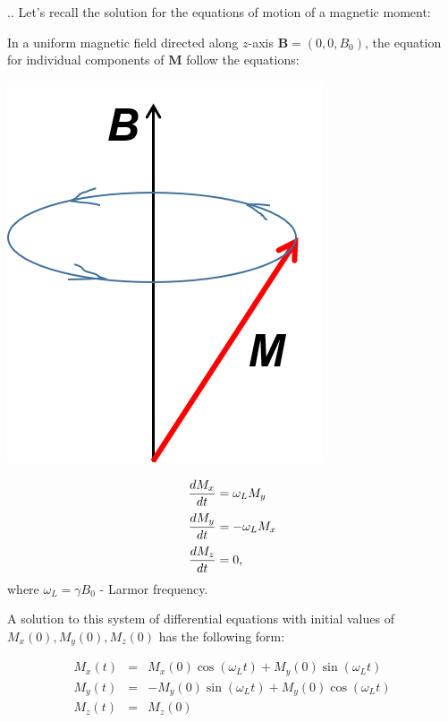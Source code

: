\documentclass{beamer}
\begin{document}
\begin{frame}[shrink=5]{\thesection.\thesubsection. \insertsubsection}
	Let's recall the solution for the equations of motion of a magnetic moment:
	
		    In a uniform magnetic field directed along $z$-axis $\bm{B} = (0, 0, B_0)$, the equation for individual components of $\bm{M}$ follow the equations:
		    
		    \begin{minipage}[b][4cm]{0.4\textwidth}
		    	\centering
		    	\includegraphics[width=0.7\textwidth]{figures/precession.png}
		    \end{minipage}
		    \hspace{0.1cm}		    
		    \begin{minipage}[b][4cm]{0.4\textwidth}
		    	\centering
		    	\begin{equation} \label{precession}
		    	\setlength{\jot}{5pt}
		    	\begin{aligned}
		    	\dfrac{dM_x}{dt} & =  \omega_L M_y \\
		    	\dfrac{dM_y}{dt} & =  -\omega_L M_x \\
		    	\dfrac{dM_z}{dt} & =  0,
		    	\end{aligned}
		    	\end{equation}
		    	where $\omega_L = \gamma B_0$ - \alert{Larmor frequency}.
		    \end{minipage}
		    
		    
		    A solution to this system of differential equations with initial values of $M_x(0), M_y(0), M_z(0)$ has the following form:
		    
		    \begin{equation} 
		    \begin{array}{lcl}
		    M_x(t) &=& M_x(0) \cos(\omega_L t) + M_y(0) \sin (\omega_L t) \\
		    M_y(t) &=& -M_y(0) \sin(\omega_L t) + M_y(0) \cos (\omega_L t) \\
		    M_z(t) &=& M_z(0) 
		    \end{array}
		    \end{equation}		

		    	    
\end{frame}
\end{document}
